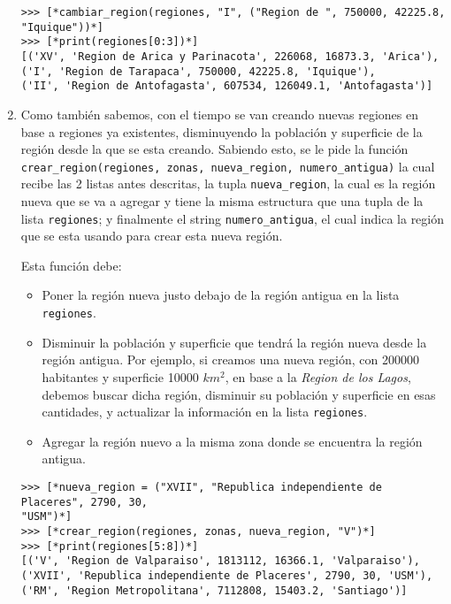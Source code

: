 \begin{enumerate}
\begin{lstlisting}[style=consola]
>>> [*cambiar_region(regiones, "I", ("Region de ", 750000, 42225.8, "Iquique"))*]
>>> [*print(regiones[0:3])*]
[('XV', 'Region de Arica y Parinacota', 226068, 16873.3, 'Arica'), 
('I', 'Region de Tarapaca', 750000, 42225.8, 'Iquique'), 
('II', 'Region de Antofagasta', 607534, 126049.1, 'Antofagasta')]
\end{lstlisting}

    \item Como también sabemos, con el tiempo se van creando nuevas regiones en base a regiones ya existentes, disminuyendo la población y superficie de la región desde la que se esta creando. Sabiendo esto, se le pide la función \texttt{crear\_region(regiones, zonas, nueva\_region, numero\_antigua)} la cual recibe las 2 listas antes descritas, la tupla \texttt{nueva\_region}, la cual es la región nueva que se va a agregar y tiene la misma estructura que una tupla de la lista \texttt{regiones}; y finalmente el string \texttt{numero\_antigua}, el cual indica la región que se esta usando para crear esta nueva región.
    
    Esta función debe:
    \begin{itemize}
        \item Poner la región nueva justo debajo de la región antigua en la lista \texttt{regiones}.
        \item Disminuir la población y superficie que tendrá la región nueva desde la región antigua. Por ejemplo, si creamos una nueva región, con 200000 habitantes y superficie 10000 $km^2$, en base a la \textit{Region de los Lagos}, debemos buscar dicha región, disminuir su población y superficie en esas cantidades, y actualizar la información en la lista \texttt{regiones}.
        \item Agregar la región nuevo a la misma zona donde se encuentra la región antigua.
    \end{itemize} 
    
\begin{lstlisting}[style=consola]
>>> [*nueva_region = ("XVII", "Republica independiente de Placeres", 2790, 30,
"USM")*]
>>> [*crear_region(regiones, zonas, nueva_region, "V")*]
>>> [*print(regiones[5:8])*]
[('V', 'Region de Valparaiso', 1813112, 16366.1, 'Valparaiso'), 
('XVII', 'Republica independiente de Placeres', 2790, 30, 'USM'), 
('RM', 'Region Metropolitana', 7112808, 15403.2, 'Santiago')]
\end{lstlisting}

\end{enumerate}
